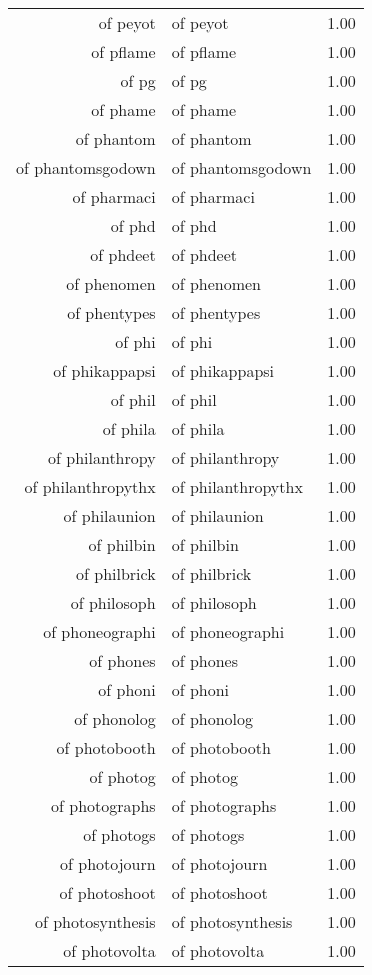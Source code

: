 \begin{table}[ht]
\begin{tabular}{rlr}
  of peyot & of peyot & 1.00 \\ 
  of pflame & of pflame & 1.00 \\ 
  of pg & of pg & 1.00 \\ 
  of phame & of phame & 1.00 \\ 
  of phantom & of phantom & 1.00 \\ 
  of phantomsgodown & of phantomsgodown & 1.00 \\ 
  of pharmaci & of pharmaci & 1.00 \\ 
  of phd & of phd & 1.00 \\ 
  of phdeet & of phdeet & 1.00 \\ 
  of phenomen & of phenomen & 1.00 \\ 
  of phentypes & of phentypes & 1.00 \\ 
  of phi & of phi & 1.00 \\ 
  of phikappapsi & of phikappapsi & 1.00 \\ 
  of phil & of phil & 1.00 \\ 
  of phila & of phila & 1.00 \\ 
  of philanthropy & of philanthropy & 1.00 \\ 
  of philanthropythx & of philanthropythx & 1.00 \\ 
  of philaunion & of philaunion & 1.00 \\ 
  of philbin & of philbin & 1.00 \\ 
  of philbrick & of philbrick & 1.00 \\ 
  of philosoph & of philosoph & 1.00 \\ 
  of phoneographi & of phoneographi & 1.00 \\ 
  of phones & of phones & 1.00 \\ 
  of phoni & of phoni & 1.00 \\ 
  of phonolog & of phonolog & 1.00 \\ 
  of photobooth & of photobooth & 1.00 \\ 
  of photog & of photog & 1.00 \\ 
  of photographs & of photographs & 1.00 \\ 
  of photogs & of photogs & 1.00 \\ 
  of photojourn & of photojourn & 1.00 \\ 
  of photoshoot & of photoshoot & 1.00 \\ 
  of photosynthesis & of photosynthesis & 1.00 \\ 
  of photovolta & of photovolta & 1.00 \\ 

\end{tabular}
\end{table}
